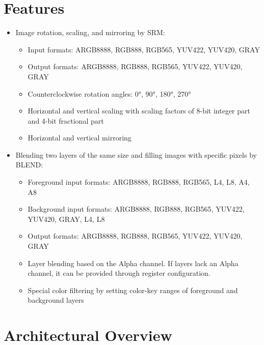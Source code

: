 \documentclass[main\_\_EN.tex]{subfiles}
\begin{document}

\section{Features}

\begin{itemize}
    \item Image rotation, scaling, and mirroring by SRM:
        \begin{itemize}
            \item Input formats: ARGB8888, RGB888, RGB565, YUV422, YUV420, GRAY
            \item Output formats: ARGB8888, RGB888, RGB565, YUV422, YUV420, GRAY
            \item Counterclockwise rotation angles: 0°, 90°, 180°, 270°
            \item Horizontal and vertical scaling with scaling factors of 8-bit integer part and 4-bit fractional part
            \item Horizontal and vertical mirroring
        \end{itemize}
    \item Blending two layers of the same size and filling images with specific pixels by BLEND:
        \begin{itemize}
            \item Foreground input formats: ARGB8888, RGB888, RGB565, L4, L8, A4, A8
            \item Background input formats: ARGB8888, RGB888, RGB565, YUV422, YUV420, GRAY, L4, L8
            \item Output formats: ARGB8888, RGB888, RGB565, YUV422, YUV420, GRAY
            \item Layer blending based on the Alpha channel. If layers lack an Alpha channel, it can be provided through register configuration.
            \item Special color filtering by setting color-key ranges of foreground and background layers
        \end{itemize}
\end{itemize}




\section{Architectural Overview}
\label{sec:ppa-arch-overview}
\end{document}

